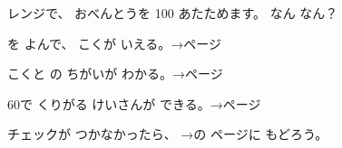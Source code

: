\bkproblem \mbox{}レンジで、 おべんとうを \mbox{100} あたためます。 なん なん？
\begin{furikaeri}
\begin{checklist}
\item \mbox{}を よんで、 こくが いえる。\hfill{\footnotesize\sffamily\color{bkTheme}→\pageref{bk:1-10:shikumi}ページ}
\item {}こくと \mbox{}の ちがいが わかる。\hfill{\footnotesize\sffamily\color{bkTheme}→\pageref{bk:1-10:jikan}ページ}
\item 60で くりがる けいさんが できる。\hfill{\footnotesize\sffamily\color{bkTheme}→\pageref{bk:1-10:rokujuu}ページ}
\end{checklist}
チェックが つかなかったら、 →の ページに もどろう。
\end{furikaeri}

\clearpage
